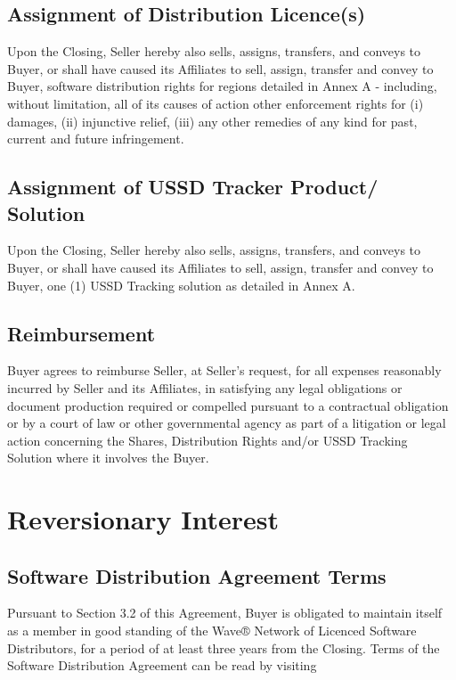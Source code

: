 \documentclass[letterpaper,10pt,english]{sphinxmanual}
\begin{document}
\subsection{Assignment of Distribution Licence(s)}
\label{\detokenize{3-transfer:assignment-of-distribution-licence-s}}
Upon the Closing, Seller hereby also sells, assigns, transfers, and conveys to Buyer, or shall have caused its Affiliates to sell, assign, transfer and convey to Buyer, software distribution rights for regions detailed in Annex A - including, without limitation, all of its causes of action other enforcement rights for (i) damages, (ii) injunctive relief, (iii) any other remedies of any kind for past, current and future infringement.


\subsection{Assignment of USSD Tracker Product/ Solution}
\label{\detokenize{3-transfer:assignment-of-ussd-tracker-product-solution}}
Upon the Closing, Seller hereby also sells, assigns, transfers, and conveys to Buyer, or shall have caused its Affiliates to sell, assign, transfer and convey to Buyer, one (1) USSD Tracking solution as detailed in Annex A.


\subsection{Reimbursement}
\label{\detokenize{3-transfer:reimbursement}}
Buyer agrees to reimburse Seller, at Seller’s request, for all expenses reasonably incurred by Seller and its Affiliates, in satisfying any legal obligations or document production required or compelled pursuant to a contractual obligation or by a court of law or other governmental agency as part of a litigation or legal action concerning the Shares, Distribution Rights and/or USSD Tracking Solution where it involves the Buyer.


\section{Reversionary Interest}
\label{\detokenize{4-reversionary:reversionary-interest}}\label{\detokenize{4-reversionary::doc}}

\subsection{Software Distribution Agreement Terms}
\label{\detokenize{4-reversionary:software-distribution-agreement-terms}}
Pursuant to Section 3.2 of this Agreement, Buyer is obligated to maintain itself as a member in good standing of the Wave® Network of Licenced Software Distributors, for a period of at least three years from the Closing. Terms of the Software Distribution Agreement can be read by visiting 
\end{document}
